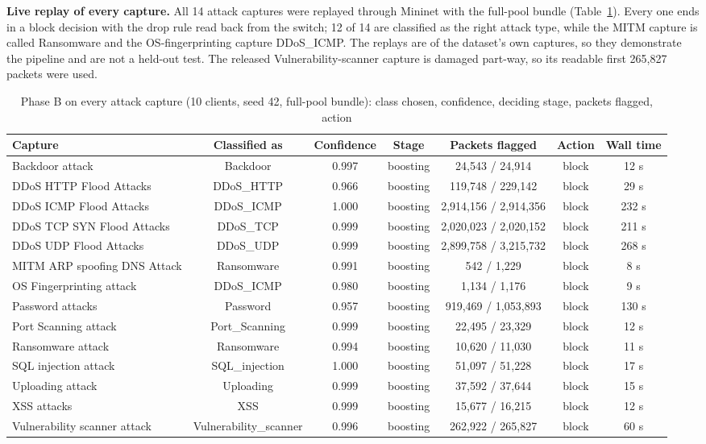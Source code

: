 \textbf{Live replay of every capture.} All 14 attack captures were replayed through Mininet with the full-pool bundle (Table~\ref{tab:full_phase_b_all}). Every one ends in a block decision with the drop rule read back from the switch; 12 of 14 are classified as the right attack type, while the MITM capture is called Ransomware and the OS-fingerprinting capture DDoS\_ICMP. The replays are of the dataset's own captures, so they demonstrate the pipeline and are not a held-out test. The released Vulnerability-scanner capture is damaged part-way, so its readable first 265{,}827 packets were used.

\begin{table}[H]
\centering
\scriptsize
\setlength{\tabcolsep}{3pt}
\renewcommand{\arraystretch}{1.15}
\begin{tabular}{|l|c|c|c|c|c|c|}
\hline
\textbf{Capture} & \textbf{Classified as} & \textbf{Confidence} & \textbf{Stage} & \textbf{Packets flagged} & \textbf{Action} & \textbf{Wall time} \\ \hline
Backdoor attack & Backdoor & 0.997 & boosting & 24,543 / 24,914 & block & 12 s \\ \hline
DDoS HTTP Flood Attacks & DDoS\_HTTP & 0.966 & boosting & 119,748 / 229,142 & block & 29 s \\ \hline
DDoS ICMP Flood Attacks & DDoS\_ICMP & 1.000 & boosting & 2,914,156 / 2,914,356 & block & 232 s \\ \hline
DDoS TCP SYN Flood Attacks & DDoS\_TCP & 0.999 & boosting & 2,020,023 / 2,020,152 & block & 211 s \\ \hline
DDoS UDP Flood Attacks & DDoS\_UDP & 0.999 & boosting & 2,899,758 / 3,215,732 & block & 268 s \\ \hline
MITM ARP spoofing DNS Attack & Ransomware & 0.991 & boosting & 542 / 1,229 & block & 8 s \\ \hline
OS Fingerprinting attack & DDoS\_ICMP & 0.980 & boosting & 1,134 / 1,176 & block & 9 s \\ \hline
Password attacks & Password & 0.957 & boosting & 919,469 / 1,053,893 & block & 130 s \\ \hline
Port Scanning attack & Port\_Scanning & 0.999 & boosting & 22,495 / 23,329 & block & 12 s \\ \hline
Ransomware attack & Ransomware & 0.994 & boosting & 10,620 / 11,030 & block & 11 s \\ \hline
SQL injection attack & SQL\_injection & 1.000 & boosting & 51,097 / 51,228 & block & 17 s \\ \hline
Uploading attack & Uploading & 0.999 & boosting & 37,592 / 37,644 & block & 15 s \\ \hline
XSS attacks & XSS & 0.999 & boosting & 15,677 / 16,215 & block & 12 s \\ \hline
Vulnerability scanner attack & Vulnerability\_scanner & 0.996 & boosting & 262,922 / 265,827 & block & 60 s \\ \hline
\end{tabular}
\caption{Phase B on every attack capture (10 clients, seed 42, full-pool bundle): class chosen, confidence, deciding stage, packets flagged, action}
\label{tab:full_phase_b_all}
\end{table}
